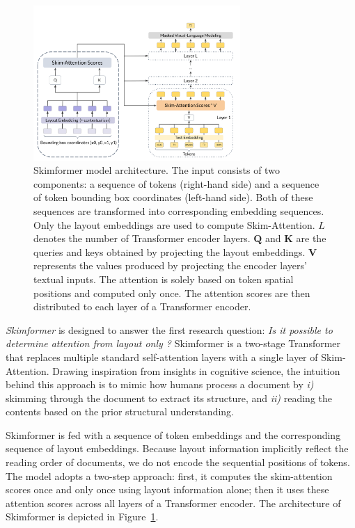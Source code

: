 \begin{figure}[h]
    \centering
    \includegraphics[width=0.7\textwidth]{images/chapter3/skimformer-architecture.pdf}
    \caption{Skimformer model architecture. The input consists of two components: a sequence of tokens (right-hand side) and a sequence of token bounding box coordinates (left-hand side). Both of these sequences are transformed into corresponding embedding sequences. Only the layout embeddings are used to compute Skim-Attention. $L$ denotes the number of Transformer encoder layers. $\bm{Q}$ and $\bm{K}$ are the queries and keys obtained by projecting the layout embeddings. $\bm{V}$ represents the values produced by projecting the encoder layers' textual inputs. The attention is solely based on token spatial positions and computed only once. The attention scores are then distributed to each layer of a Transformer encoder.}
    \label{fig:skimformer-architecture}
\end{figure}

\emph{Skimformer} is designed to answer the first research question: \textit{Is it possible to determine attention from layout only ?} Skimformer is a two-stage Transformer that replaces multiple standard self-attention layers with a single layer of Skim-Attention. Drawing inspiration from insights in cognitive science, the intuition behind this approach is to mimic how humans process a document by \emph{i)} skimming through the document to extract its structure, and \emph{ii)}  reading the contents based on the prior structural understanding. 

Skimformer is fed with a sequence of token embeddings and the corresponding sequence of layout embeddings. Because layout information implicitly reflect the reading order of documents, we do not encode the sequential positions of tokens. The model adopts a two-step approach: first, it computes the skim-attention scores once and only once using layout information alone; then it uses these attention scores across all layers of a Transformer encoder. The architecture of Skimformer is depicted in Figure~\ref{fig:skimformer-architecture}.

